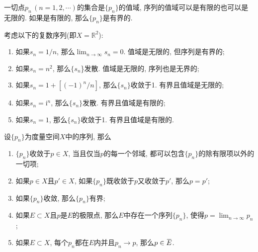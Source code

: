 \documentclass[cn,12pt,math=mtpro2,citestyle=gb7714-2015,bibstyle=gb7714-2015,twocol]{elegantbook}
\newcommand{\R}{\mathbb{R}}
\newcommand{\limn }{\lim_{n\to\infty}}
\newcommand{\overbar}[1]{\mkern 1.5mu\overline{\mkern-1.5mu#1\mkern-1.5mu}\mkern 1.5mu}
\begin{document}
\begin{definition}
一切点$p_n\,(n=1,2,\cdots)$的集合是$\{p_n\}$的值域, 序列的值域可以是有限的也可以是无限的. 如果是有限的, 那么$\{p_n\}$是有界的.
\end{definition}
\begin{example}
考虑以下的复数序列(即$X=\R^2$):
\begin{enumerate}[label=(\alph*)]
\item 如果$s_n=1/n$, 那么$\displaystyle\limn  s_n=0$. 值域是无限的, 但序列是有界的;

\item 如果$s_n=n^2$, 那么$\{s_n$\}发散. 值域是无限的, 序列也是无界的;

\item 如果$s_n=1+[(-1)^n/n]$, 那么$\{s_n\}$收敛于1. 有界且值域是无限的;

\item 如果$s_n=\text{i}^n$, 那么$\{s_n\}$发散. 有界且值域是有限的;

\item 如果$s_n=1$, 那么$\{s_n\}$收敛于1. 有界且值域是有限的.
\end{enumerate}
\end{example}
\begin{theorem}\label{thm:th3.5}
  设$\{p_n\}$为度量空间$X$中的序列, 那么
  \begin{enumerate}[label=(\arabic*)]
  \item $\{p_n\}$收敛于$p\in X$, 当且仅当$p$的每一个邻域, 都可以包含$\{p_n\}$的除有限项以外的一切项;

  \item 如果$p\in X$且$p'\in X$, 如果$\{p_n\}$既收敛于$p$又收敛于$p'$, 那么$p=p'$;

  \item 如果$\{p_n\}$收敛, 那么$\{p_n\}$有界;

  \item 如果$E\subset X$且$p$是$E$的极限点, 那么$E$中存在一个序列$\{p_n\}$, 使得$ p=\limn  p_n$;

  \item 如果$E\subset X$, 每个$p_n$都在$E$内并且$p_n\rightarrow p$, 那么$p\in \overbar{E}$.
  \end{enumerate}
  \end{theorem}
\end{document}
